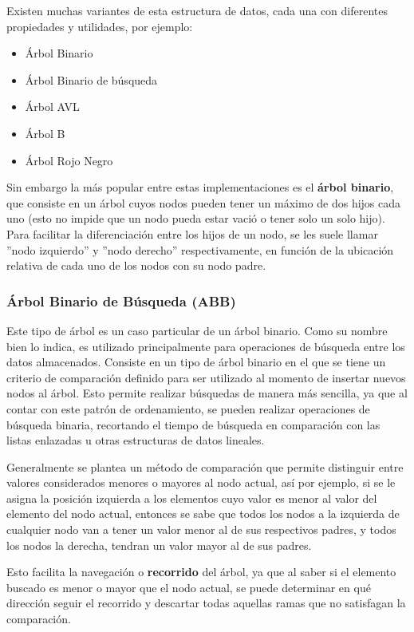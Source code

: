 \documentclass[titlepage,a4paper]{article}
\begin{document}
Existen muchas variantes de esta estructura de datos, cada una con diferentes
propiedades y utilidades, por ejemplo: 

\begin{itemize}
	\item Árbol Binario
	\item Árbol Binario de búsqueda
	\item Árbol AVL
	\item Árbol B
	\item Árbol Rojo Negro
\end{itemize}

Sin embargo la más popular entre estas implementaciones es el \textbf{árbol
binario}, que consiste en un árbol cuyos nodos pueden tener un máximo de dos
hijos cada uno (esto no impide que un nodo pueda estar vació o tener solo un
solo hijo). Para facilitar la diferenciación entre los hijos de un nodo, se les
suele llamar ''nodo izquierdo'' y ''nodo derecho'' respectivamente, en función
de la ubicación relativa de cada uno de los nodos con su nodo padre.


									 \subsubsection{Árbol Binario de Búsqueda (ABB)}

Este tipo de árbol es un caso particular de un árbol binario. Como su nombre
bien lo indica, es utilizado principalmente para operaciones de búsqueda entre
los datos almacenados. Consiste en un tipo de árbol binario en el que se tiene
un criterio de comparación definido para ser utilizado al momento
de insertar nuevos nodos al árbol. Esto permite realizar búsquedas de manera
más sencilla, ya que al contar con este patrón de ordenamiento, se pueden
realizar operaciones de búsqueda binaria, recortando el tiempo de búsqueda en
comparación con las listas enlazadas u otras estructuras de datos lineales.

Generalmente se plantea un método de comparación que permite distinguir entre
valores considerados menores o mayores al nodo actual, así por ejemplo, si se
le asigna la posición izquierda a los elementos cuyo valor es menor al valor
del elemento del nodo actual, entonces se sabe que todos los nodos a la
izquierda de cualquier nodo van a tener un valor menor al de sus respectivos
padres, y todos los nodos la derecha, tendran un valor mayor al de sus padres.

Esto facilita la navegación o \textbf{recorrido} del árbol, ya que al saber si
el elemento buscado es menor o mayor que el nodo actual, se puede determinar
en qué dirección seguir el recorrido y descartar todas aquellas ramas que no
satisfagan la comparación.
\end{document}
